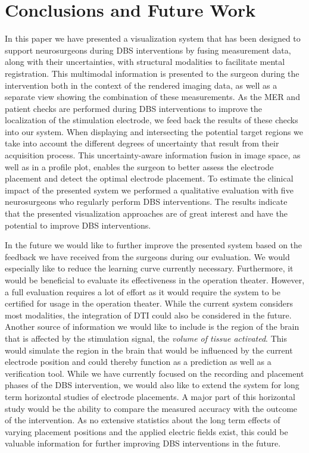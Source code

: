 \documentclass{vgtc}                          %
\begin{document}
\section{Conclusions and Future Work}\label{sec:conclusions}
In this paper we have presented a visualization system that has been designed to support neurosurgeons during DBS interventions by fusing measurement data, along with their uncertainties, with structural modalities to facilitate mental registration. This multimodal information is presented to the surgeon during the intervention both in the context of the rendered imaging data, as well as a separate view showing the combination of these measurements. As the MER and patient checks are performed during DBS interventions to improve the localization of the stimulation electrode, we feed back the results of these checks into our system. When displaying and intersecting the potential target regions we take into account the different degrees of uncertainty that result from their acquisition process. This uncertainty-aware information fusion in image space, as well as in a profile plot, enables the surgeon to better assess the electrode placement and detect the optimal electrode placement. To estimate the clinical impact of the presented system we performed a qualitative evaluation with five neurosurgeons who regularly perform DBS interventions. The results indicate that the presented visualization approaches are of great interest and have the potential to improve DBS interventions.

In the future we would like to further improve the presented system based on the feedback we have received from the surgeons during our evaluation. We would especially like to reduce the learning curve currently necessary. Furthermore, it would be beneficial to evaluate its effectiveness in the operation theater. However, a full evaluation requires a lot of effort as it would require the system to be certified for usage in the operation theater. While the current system considers most modalities, the integration of DTI could also be considered in the future. Another source of information we would like to include is the region of the brain that is affected by the stimulation signal, the \emph{volume of tissue activated}. This would simulate the region in the brain that would be influenced by the current electrode position and could thereby function as a prediction as well as a verification tool. While we have currently focused on the recording and placement phases of the DBS intervention, we would also like to extend the system for long term horizontal studies of electrode placements. A major part of this horizontal study would be the ability to compare the measured accuracy with the outcome of the intervention. As no extensive statistics about the long term effects of varying placement positions and the applied electric fields exist, this could be valuable information for further improving DBS interventions in the future.
\end{document}
